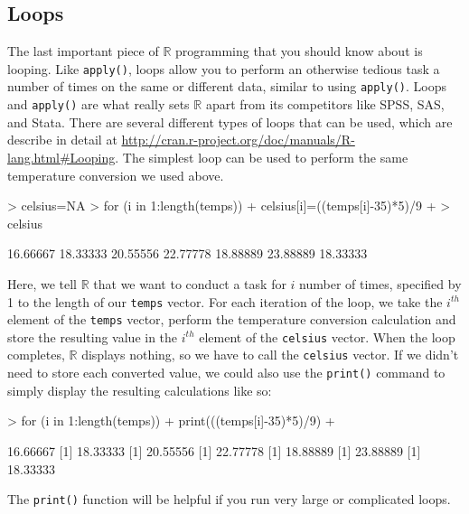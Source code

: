 \documentclass[12pt]{article}
\begin{document}
\subsection{Loops}
The last important piece of $\mathbb{R}$ programming that you should know about is looping. Like \verb|apply()|, loops allow you to perform an otherwise tedious task a number of times on the same or different data, similar to using \verb|apply()|. Loops and \verb|apply()| are what really sets $\mathbb{R}$ apart from its competitors like SPSS, SAS, and Stata. There are several different types of loops that can be used, which are describe in detail at \url{http://cran.r-project.org/doc/manuals/R-lang.html#Looping}. The simplest loop can be used to perform the same temperature conversion we used above.
\begin{Schunk}
\begin{Sinput}
> celsius=NA
> for (i in 1:length(temps)) {
+ 	celsius[i]=((temps[i]-35)*5)/9
+ }
> celsius
\end{Sinput}
\begin{Soutput}
[1] 16.66667 18.33333 20.55556 22.77778 18.88889 23.88889 18.33333
\end{Soutput}
\end{Schunk}
Here, we tell $\mathbb{R}$ that we want to conduct a task for $i$ number of times, specified by 1 to the length of our \verb|temps| vector. For each iteration of the loop, we take the $i^{th}$ element of the \verb|temps| vector, perform the temperature conversion calculation and store the resulting value in the $i^{th}$ element of the \verb|celsius| vector. When the loop completes, $\mathbb{R}$ displays nothing, so we have to call the \verb|celsius| vector. If we didn't need to store each converted value, we could also use the \verb|print()| command to simply display the resulting calculations like so:
\begin{Schunk}
\begin{Sinput}
> for (i in 1:length(temps)) {
+ 	print(((temps[i]-35)*5)/9)
+ }
\end{Sinput}
\begin{Soutput}
[1] 16.66667
[1] 18.33333
[1] 20.55556
[1] 22.77778
[1] 18.88889
[1] 23.88889
[1] 18.33333
\end{Soutput}
\end{Schunk}
The \verb|print()| function will be helpful if you run very large or complicated loops.
\end{document}
